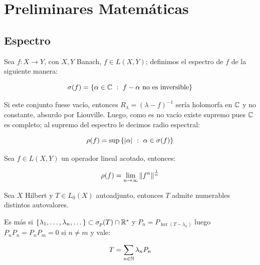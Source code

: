 \section{Preliminares Matem\'aticas}

\subsection{Espectro}

\begin{definition}
	Sea $f : X \rightarrow Y$, con $X,Y$ Banach, $f \in L(X,Y)$; definimos el espectro de $f$ de la siguiente manera:
	
	\begin{equation*}
		\sigma(f) = \left\lbrace\alpha \in \mathbb{C} ~:~ f- \alpha \text{ no es inversible}\right\rbrace
	\end{equation*}
	
	Si este conjunto fuese vac\'io, entonces $R_{\lambda} = \left(\lambda -f\right)^{-1}$ ser\'ia holomorfa en $\mathbb{C}$ y no constante, absurdo por Liouville. Luego, como es no vac\'io existe supremo pues $\mathbb{C}$ es completo; al supremo del espectro le decimos radio espectral:
	
	\begin{equation*}
	\rho(f) = \sup \left\lbrace\left\lvert\alpha\right\rvert ~:~ \alpha \in \sigma(f)\right\rbrace
	\end{equation*}
	
\end{definition}

\begin{proposition}
	\label{prop: teorema de gelfand}
	Sea $f \in L(X,Y)$ un operador lineal acotado, entonces:
	
	\begin{equation*}
		\rho(f) = \lim\limits_{n \to \infty} \left\lVert f^n\right\rVert^{\frac{1}{n}}
	\end{equation*}
	
\end{proposition}

\begin{theorem}
	Sea $X$ Hilbert y $T \in L_0(X)$ autoadjunto, entonces $T$ admite numerables distintos autovalores. 
	
	Es m\'as si $\left\lbrace\lambda_1, \dots, \lambda_n, \dots\right\rbrace \subset \sigma_p(T) \cap {\mathbb{R}}^{\ast}$ y $P_n = P_{\ker(T-\lambda_n)}$ luego $P_nP_n = P_nP_m = 0$ si $n \neq m$ y vale:
	
	\begin{equation}
	\label{eq: Teorema espectral}
	T = \sum\limits_{n \in {\mathbb{N}}}{\lambda_n P_n}
	\end{equation}
\end{theorem}

